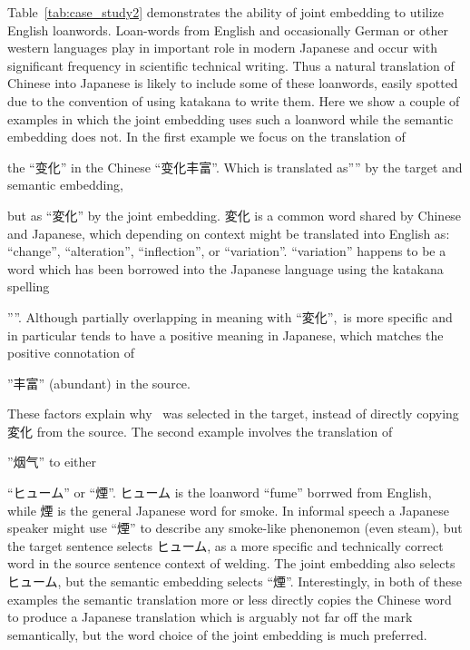 \begin{CJK}{UTF8}{ipxm}
    Table~\ref{tab:case_study2} demonstrates the ability of joint embedding to utilize English loanwords.  Loan-words from English and occasionally German or other western languages play in important role in modern Japanese and occur with significant frequency in scientific technical writing.  Thus a natural translation of Chinese into Japanese is likely to include some of these loanwords, easily spotted due to the convention of using katakana to write them.  Here we show a couple of examples in which the joint embedding uses such a loanword while the semantic embedding does not.  In the first example we focus on the translation of
\end{CJK}\begin{CJK}{UTF8}{gbsn}the ``变化'' in the Chinese \mbox{``变化丰富''}.
Which is translated as''\variation'' by the target and semantic embedding,
\end{CJK}\begin{CJK}{UTF8}{ipxm}
but as ``変化'' by the joint embedding.
変化 is a common word shared by Chinese and Japanese, which depending on context might be translated into English as: ``change'', ``alteration'', ``inflection'', or ``variation''.  ``variation'' happens to be a word which has been borrowed into the Japanese language using the katakana spelling
\end{CJK}\begin{CJK}{UTF8}{ipxm}''\variation''.  Although partially overlapping in meaning with ``変化'',\enspace\variation\ is more specific and in particular tends to have a positive meaning in Japanese, which matches the positive connotation of
\end{CJK}\begin{CJK}{UTF8}{gbsn}''丰富'' (abundant) in the source.
\end{CJK}\begin{CJK}{UTF8}{ipxm}These factors explain why \variation\ was selected in the target, instead of directly copying 変化 from the source.  The second example involves the translation of
\end{CJK}\begin{CJK}{UTF8}{gbsn}''烟气'' to either
\end{CJK}\begin{CJK}{UTF8}{ipxm}``ヒューム'' or ``煙''.
ヒューム is the loanword ``fume'' borrwed from English, while 煙 is the general Japanese word for smoke.  In informal speech a Japanese speaker might use ``煙'' to describe any smoke-like phenonemon (even steam), but the target sentence selects ヒューム, as a more specific and technically correct word in the source sentence context of welding.  The joint embedding also selects ヒューム, but the semantic embedding selects ``煙''.
Interestingly, in both of these examples the semantic translation more or less directly copies the Chinese word to produce a Japanese translation which is arguably not far off the mark semantically, but the word choice of the joint embedding is much preferred.
\end{CJK}

